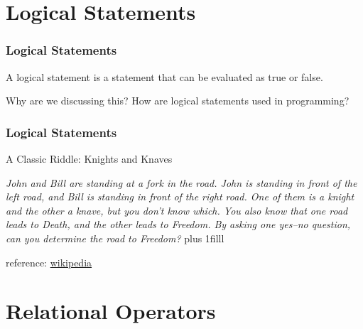 \documentclass[fleqn]{beamer} %
\newcommand{\sectiontitleII}{Logical Statements }
\newcommand{\sectiontitleIII}{Relational Operators}
\newcommand{\btVFill}{\vskip0pt plus 1filll}
\begin{document}
\section{\sectiontitleII}

	\begin{frame}[label=sectionII,containsverbatim] \small
		\frametitle{\sectiontitleII}
		
A {\PR logical statement} is a statement that can be evaluated as {\GR true} or {\RD false}. \vspcc

Why are we discussing this? How are logical statements used in programming? \vspcc


		
	\end{frame}

	\begin{frame} \small
		\frametitle{\sectiontitleII}
		
		A Classic Riddle: Knights and Knaves \vspccc
		
		{\it John and Bill are standing at a fork in the road. John is standing in front of the left road, and Bill is standing in front of the right road. One of them is a knight and the other a knave, but you don't know which. You also know that one road leads to Death, and the other leads to Freedom. By asking one yes–no question, can you determine the road to Freedom?} 
		\btVFill
		
		\tiny{reference: \href{https://en.wikipedia.org/wiki/Knights_and_Knaves}{wikipedia} } 	

	\end{frame}	


\section{\sectiontitleIII}
\end{document}
